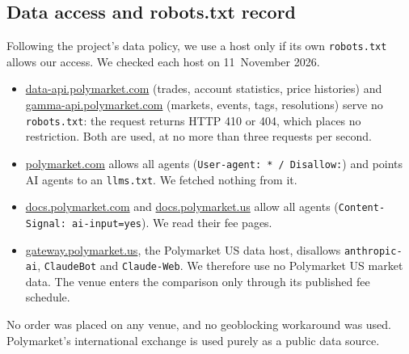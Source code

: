 \subsection{Data access and robots.txt record}\label{app:wallets-robots}
Following the project's data policy, we use a host only if its own \texttt{robots.txt} allows
our access. We checked each host on 11~November 2026.
\begingroup\sloppy
\begin{itemize}
  \item \url{data-api.polymarket.com} (trades, account statistics, price histories) and
    \url{gamma-api.polymarket.com} (markets, events, tags, resolutions) serve no
    \texttt{robots.txt}: the request returns HTTP 410 or 404, which places no restriction. Both are
    used, at no more than three requests per second.
  \item \url{polymarket.com} allows all agents (\texttt{User-agent: * / Disallow:}) and points AI
    agents to an \texttt{llms.txt}. We fetched nothing from it.
  \item \url{docs.polymarket.com} and \url{docs.polymarket.us} allow all agents
    (\texttt{Content-Signal: ai-input=yes}). We read their fee pages.
  \item \url{gateway.polymarket.us}, the Polymarket US data host, disallows \texttt{anthropic-ai},
    \texttt{ClaudeBot} and \texttt{Claude-Web}. We therefore use no Polymarket US market data. The
    venue enters the comparison only through its published fee schedule.
\end{itemize}
\endgroup
No order was placed on any venue, and no geoblocking workaround was used. Polymarket's
international exchange is used purely as a public data source.

